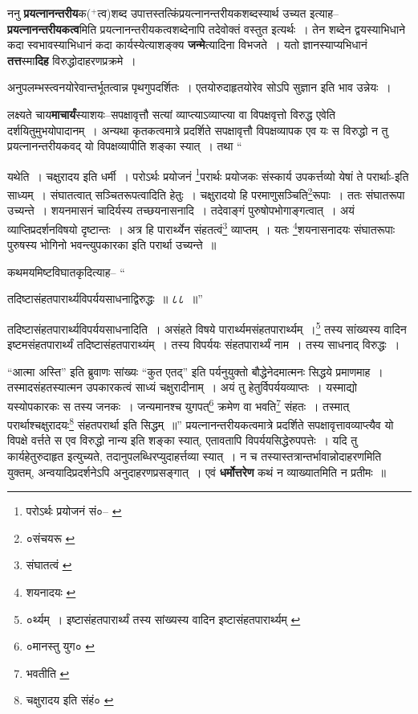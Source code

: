 \documentclass[article,12pt,a4paper]{memoir}
\newcommand{\add}[1]{($^{+}$#1)}
\begin{document}
	  \pstart ननु \textbf{प्रयत्नानन्तरीय}क\add{त्व}शब्द उपात्तस्तत्किंप्रयत्नानन्तरीयकशब्दस्यार्थ उच्यत इत्याह--\textbf{प्रयत्नानन्तरीयकत्व}मिति प्रयत्नानन्तरीयकत्वशब्देनापि तदेवोक्तं वस्तुत इत्यर्थः । तेन शब्देन द्वयस्याभिधाने कदा स्वभावस्याभिधानं कदा कार्यस्येत्याशङ्क्य \textbf{जन्मे}त्यादिना विभजते । यतो ज्ञानस्याप्यभिधानं \textbf{तत्त}स्मा\textbf{दिह} विरुद्धोदाहरणप्रक्रमे ।
	\pend
      

	  \pstart अनुपलम्भस्त्वनयोरेवान्तर्भूतत्वान्न पृथगुपदर्शितः । एतयोरुदाहृतयोरेव सोऽपि सुज्ञान इति भाव उन्नेयः ।
	\pend
      

	  \pstart लक्ष्यते चाय\textbf{माचार्यं}स्याशयः--सपक्षावृत्तौ सत्यां व्याप्त्याऽव्याप्त्या वा विपक्षवृत्तो विरुद्ध एवेति दर्शयितुमुभयोपादानम् । अन्यथा कृतकत्वमात्रे प्रदर्शिते सपक्षावृत्तौ विपक्षव्यापक एव यः स विरुद्धो न तु प्रयत्नानन्तरीयकवद् यो विपक्षव्यापीति शङ्का स्यात् । तथा  \leavevmode{} “
	  
	यथेति । चक्षुरादय इति धर्मी । परोऽर्थः प्रयोजनं \footnote{परोऽर्थः प्रयोजनं सं०--\cite{dp-msA} \cite{dp-msB} \cite{dp-msC} \cite{dp-msD} \cite{dp-edP} \cite{dp-edH} \cite{dp-edE} \cite{dp-edN}}\-परार्थः प्रयोजकः संस्कार्य उपकर्त्तव्यो येषां ते परार्थाः-इति साध्यम् । संघातत्वात् सञ्चितरूपत्वादिति हेतुः । चक्षुरादयो हि परमाणुसञ्चिति\footnote{०संचयरू \cite{dp-msC} \cite{dp-msD}}\-रूपाः । ततः संघातरूपा उच्यन्ते । शयनमासनं चादिर्यस्य तच्छयनासनादि । तदेवाङ्गं पुरुषोपभोगाङ्गत्वात् । अयं व्याप्तिप्रदर्शनविषयो दृष्टान्तः । अत्र हि पारार्थ्येन संहतत्वं\footnote{संघातत्वं \cite{dp-msD}} व्याप्तम् । यतः \footnote{शयनादयः \cite{dp-msD}}\-शयनासनादयः संघातरूपाः पुरुषस्य भोगिनो भवन्त्युपकारका इति परार्था उच्यन्ते ॥ 
	  
	कथमयमिष्टविघातकृदित्याह-- “
	  
	तदिष्टासंहतपारार्थ्यविपर्ययसाधनाद्विरुद्धः ॥ ८८ ॥” 
	  
	तदिष्टासंहतपारार्थ्यविपर्ययसाधनादिति । असंहते विषये पारार्थ्यमसंहतपारार्थ्यम् ।\footnote{०र्थ्यम् । इष्टासंहतपारार्थ्यं तस्य सांख्यस्य वादिन इष्टासंहतपारार्थ्यम् \cite{dp-msC} \cite{dp-msD}} तस्य सांख्यस्य वादिन इष्टमसंहतपारार्थ्यं तदिष्टासंहतपाराथ्यंम् । तस्य विपर्ययः संहतपारार्थ्यं नाम । तस्य साधनाद् विरुद्धः । 
	  
	“आत्मा अस्ति” इति ब्रुवाणः सांख्यः “कुत एतद्” इति पर्यनुयुक्तो बौद्धेनेदमात्मनः सिद्धये प्रमाणमाह । तस्मादसंहतस्यात्मन उपकारकत्वं साध्यं चक्षुरादीनाम् । अयं तु हेतुर्विपर्ययव्याप्तः । यस्माद्यो यस्योपकारकः स तस्य जनकः । जन्यमानश्च युगपत्\footnote{०मानस्तु युग० \cite{dp-msD}} क्रमेण वा भवति\footnote{भवतीति \cite{dp-msD}} संहतः । तस्मात् परार्थाश्चक्षुरादयः\footnote{चक्षुरादय इति संहं० \cite{dp-msA} \cite{dp-msB} \cite{dp-edP} \cite{dp-edH} \cite{dp-edN}} संहतपरार्था इति सिद्धम् ॥” प्रयत्नानन्तरीयकत्वमात्रे प्रदर्शिते सपक्षावृत्तावव्याप्त्यैव यो विपक्षे वर्त्तते स एव विरुद्धो नान्य इति शङ्का स्यात्, एतावतापि \leavevmode{} विपर्ययसिद्धेरुपपत्तेः । यदि तु कार्यहेतुरुदाहृत इत्युच्यते, तदानुपलब्धिरप्युदाहर्त्तव्या स्यात् । न च तस्यास्तत्रान्तर्भावान्नोदाहरणमिति युक्तम्, अन्वयादिप्रदर्शनेऽपि अनुदाहरणप्रसङ्गात् । एवं \textbf{धर्मोत्तरेण} कथं न व्याख्यातमिति न प्रतीमः ॥
	\pend
      
\end{document}
